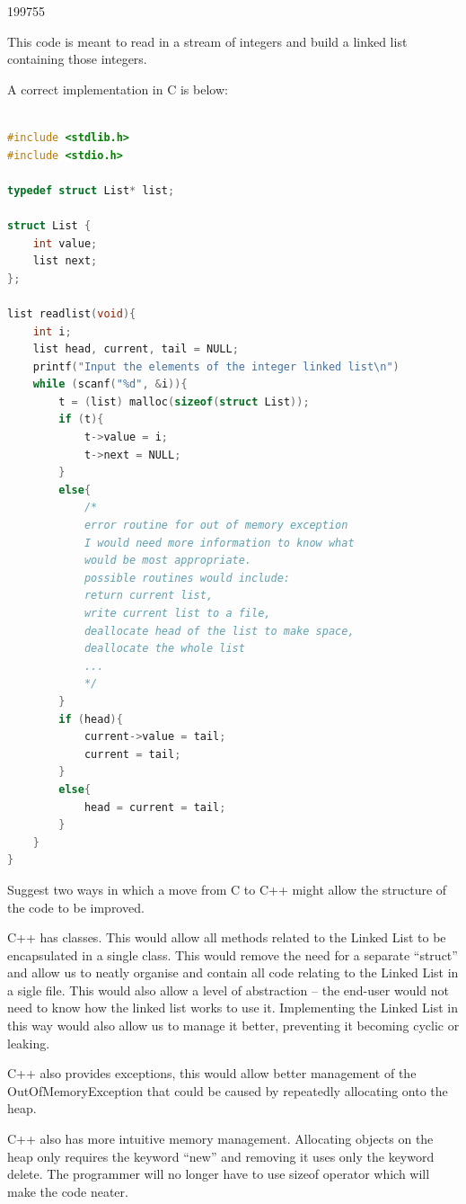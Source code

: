 \documentclass[10pt,\jkfside,a4paper]{article}
\begin{document}
\begin{examquestion}{1997}{5}{5}
\begin{itemize}
\end{itemize}

This code is meant to read in a stream of integers and build a linked list
containing those integers.

A correct implementation in C is below:

\begin{lstlisting}[language=C]

#include <stdlib.h>
#include <stdio.h>

typedef struct List* list;

struct List {
	int value;
	list next;
};

list readlist(void){
	int i;
	list head, current, tail = NULL;
	printf("Input the elements of the integer linked list\n")
	while (scanf("%d", &i)){
		t = (list) malloc(sizeof(struct List));
		if (t){
			t->value = i;
			t->next = NULL;
		}
		else{
			/*
			error routine for out of memory exception
			I would need more information to know what
			would be most appropriate.
			possible routines would include:
			return current list,
			write current list to a file,
			deallocate head of the list to make space,
			deallocate the whole list
			...
			*/
		}
		if (head){
			current->value = tail;
			current = tail;
		}
		else{
			head = current = tail;
		}
	}
}

\end{lstlisting}

Suggest two ways in which a move from C to C++ might allow the structure of
the code to be improved.

C++ has classes. This would allow all methods related to the Linked List to
be encapsulated in a single class. This would remove the need for a separate
``struct'' and allow us to neatly organise and contain all code relating to
the Linked List in a sigle file. This would also allow a level of
abstraction -- the end-user would not need to know how the linked list works
to use it. Implementing the Linked List in this way would also allow us to
manage it better, preventing it becoming cyclic or leaking.

C++ also provides exceptions, this would allow better management of the
OutOfMemoryException that could be caused by repeatedly allocating onto the
heap.

C++ also has more intuitive memory management. Allocating objects on the heap
only requires the keyword ``new'' and removing it uses only the keyword delete.
The programmer will no longer have to use sizeof operator which will make
the code neater.

\end{examquestion}
\end{document}
